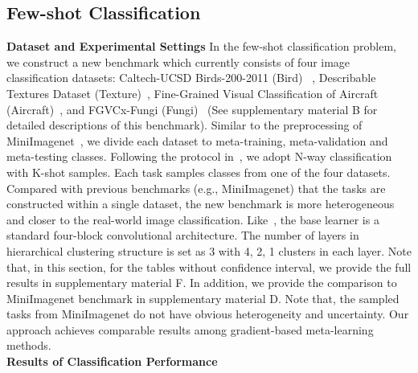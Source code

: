 \documentclass{article}
\begin{document}
\subsection{Few-shot Classification}
\textbf{Dataset and Experimental Settings}
In the few-shot classification problem, we construct a new benchmark which currently consists of four image classification datasets: Caltech-UCSD Birds-200-2011 (Bird)
~\cite{WahCUB_200_2011}, Describable Textures Dataset (Texture)~\cite{cimpoi14describing}, Fine-Grained Visual Classification of Aircraft (Aircraft)\mbox{~\cite{maji13fine-grained}}, and FGVCx-Fungi (Fungi)~\cite{Fungi} (See supplementary material B for detailed descriptions of this benchmark). Similar to the preprocessing of MiniImagenet~\cite{vinyals2016matching}, we divide each dataset to meta-training, meta-validation and meta-testing classes. Following the protocol in~\cite{finn2017model,ravi2016optimization,vinyals2016matching}, we adopt N-way classification with K-shot samples. Each task samples classes from one of the four datasets. Compared with previous benchmarks (e.g., MiniImagenet) that
the tasks are constructed within a single dataset, 
the new benchmark is more heterogeneous and closer to the real-world image classification. 
Like~\cite{finn2017model}, the base learner is a standard four-block convolutional architecture. The number of layers in hierarchical clustering structure is set as 3 with 4, 2, 1 clusters in each layer. Note that, in this section, for the tables without confidence interval, we provide the full results in supplementary material F. In addition, we provide the comparison to MiniImagenet benchmark in supplementary material D. Note that, the sampled tasks from MiniImagenet do not have obvious heterogeneity and uncertainty. Our approach achieves comparable results among gradient-based meta-learning methods.
\\
\textbf{Results of Classification Performance}
\end{document}
